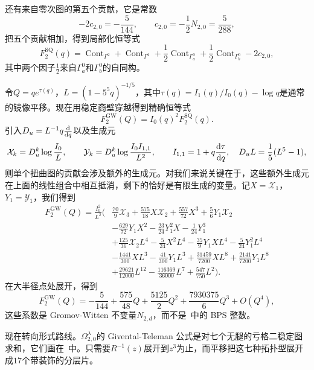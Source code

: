 \documentclass{amsart}
\theoremstyle{definition}
\theoremstyle{remark}
\theoremstyle{plain}
\theoremstyle{definition}
\theoremstyle{remark}
\newcommand{\mc}[1]{\mathcal{#1}}
\newcommand{\mr}[1]{\mathrm{#1}}
\newcommand{\1}{\mathbf{1}}
\newcommand{\2}{\mathbf{2}}
\newcommand{\3}{\mathbf{3}}
\DeclareMathOperator{\Cont}{Cont}
\begin{document}
还有来自零次图的第五个贡献，它是常数
\[ -2c_{2,0} = -\frac{5}{144}, \qquad c_{2,0} = -\frac{1}{2}N_{2,0} = \frac{5}{288}, \]
把五个贡献相加，得到局部化恒等式
\[ F_2^{\mr{SQ}}(q) = \Cont_{\Gamma^2} + \Cont_{\Gamma^1} + \frac{1}{2}\Cont_{\Gamma_a^0} + \frac{1}{2}\Cont_{\Gamma_b^0} - 2c_{2,0}, \]
其中两个因子\(\frac{1}{2}\)来自\(\Gamma_a^0\)和\(\Gamma_b^0\)的自同构。

令\(Q = qe^{\tau(q)}\)，\(L = (1-5^5q)^{-1/5}\)，其中\(\tau(q) = I_1(q)/I_0(q) - \log q\)是通常的镜像平移。现在用稳定商壁穿越得到精确恒等式
\[ F_2^{\mr{GW}}(Q) = I_0(q)^2 F_2^{\mr{SQ}}(q). \]
引入\(D_u = L^{-1}q\odv{}{q}\)以及生成元
\[ \mc{X}_k = D_u^k \log \frac{I_0}{L}, \qquad \mc{Y}_k = D_u^k \log \frac{I_0I_{1,1}}{L^2}, \qquad I_{1,1} = 1 + q \odv{\tau}{q}, \quad D_u L = \frac{1}{5}(L^5-1), \]
则单个扭曲图的贡献会涉及额外的生成元。对我们来说关键在于，这些额外生成元在上面的线性组合中相互抵消，剩下的恰好是有限生成的变量。记\(X = \mc{X}_1\)，\(Y_1 = \mc{Y}_1\)，我们得到
\begin{align*}
    F^{\mr{GW}}_2(Q) = \frac{I_0^2}{L^2}\Big(&\frac{70}{9}\mc{X}_3 + \frac{575}{18}X\mc{X}_2 + \frac{557}{72}X^3 + \frac{5}{6}Y_1\mc{X}_2 \\
    &- \frac{629}{72}Y_1X^2 - \frac{23}{24}Y_1^2 X - \frac{1}{24}Y_1^3 \\
    &+ \frac{125}{36}\mc{X}_2 L^4 - \frac{5}{24}X^2L^4 - \frac{35}{9}Y_1XL^4 - \frac{5}{24}Y_1^2L^4 \\
    &- \frac{1441}{300}XL^3 - \frac{41}{300}Y_1L^3 + \frac{31459}{7200}XL^8 + \frac{2141}{7200}Y_1L^8 \\
    &+ \frac{29621}{12000}L^{12} - \frac{116369}{36000}L^7 + \frac{547}{750}L^2\Big).
\end{align*}
在大半径点处展开，得到
\[ F_2^{\mr{GW}}(Q) = -\frac{5}{144} + \frac{575}{48}Q + \frac{5125}{2}Q^2 + \frac{7930375}{6}Q^3 + O(Q^4), \]
这些系数是 Gromov-Witten 不变量\(N_{2,d}\)，而不是~中的 BPS 整数。

现在转向形式路线。\(\Omega^{\lambda}_{2,0}\)的 Givental-Teleman 公式是对七个无腿的亏格二稳定图求和，它们画在~中。只需要\(R^{-1}(z)\)展开到\(z^3\)为止，而平移把这七种拓扑型展开成\(17\)个带装饰的分层片。
\end{document}
